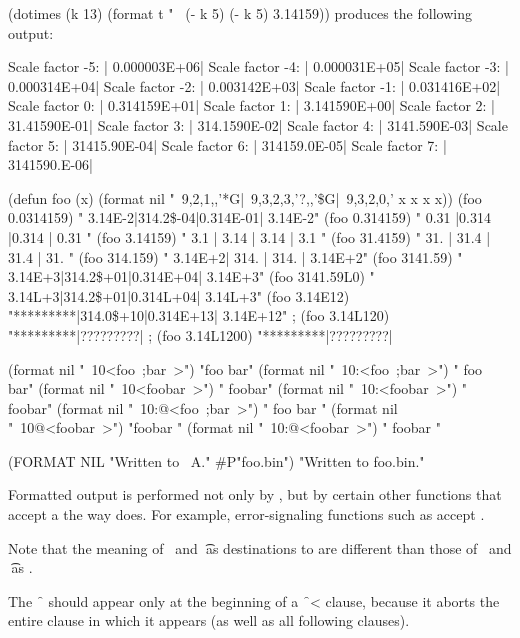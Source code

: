 \code
 (dotimes (k 13)
   (format t "~%
           (- k 5) (- k 5) 3.14159))
\endcode
produces the following output:

\code
Scale factor -5: | 0.000003E+06|
Scale factor -4: | 0.000031E+05|
Scale factor -3: | 0.000314E+04|
Scale factor -2: | 0.003142E+03|
Scale factor -1: | 0.031416E+02|
Scale factor  0: | 0.314159E+01|
Scale factor  1: | 3.141590E+00|
Scale factor  2: | 31.41590E-01|
Scale factor  3: | 314.1590E-02|
Scale factor  4: | 3141.590E-03|
Scale factor  5: | 31415.90E-04|
Scale factor  6: | 314159.0E-05|
Scale factor  7: | 3141590.E-06|
\endcode

\code
 (defun foo (x)
   (format nil "~9,2,1,,'*G|~9,3,2,3,'?,,'\$G|~9,3,2,0,'%
          x x x x))                                     
 (foo 0.0314159) \EV "  3.14E-2|314.2\$-04|0.314E-01|  3.14E-2"
 (foo 0.314159)  \EV "  0.31   |0.314    |0.314    | 0.31    "
 (foo 3.14159)   \EV "   3.1   | 3.14    | 3.14    |  3.1    "
 (foo 31.4159)   \EV "   31.   | 31.4    | 31.4    |  31.    "
 (foo 314.159)   \EV "  3.14E+2| 314.    | 314.    |  3.14E+2"
 (foo 3141.59)   \EV "  3.14E+3|314.2\$+01|0.314E+04|  3.14E+3"
 (foo 3141.59L0) \EV "  3.14L+3|314.2\$+01|0.314L+04|  3.14L+3"
 (foo 3.14E12)   \EV "*********|314.0\$+10|0.314E+13| 3.14E+12"
 ; (foo 3.14L120)  \EV "*********|?????????|%
 ; (foo 3.14L1200) \EV "*********|?????????|%
\endcode

\code
 (format nil "~10<foo~;bar~>")   \EV "foo    bar"
 (format nil "~10:<foo~;bar~>")  \EV "  foo  bar"
 (format nil "~10<foobar~>")     \EV "    foobar"
 (format nil "~10:<foobar~>")    \EV "    foobar"
 (format nil "~10:@<foo~;bar~>") \EV "  foo bar "
 (format nil "~10@<foobar~>")    \EV "foobar    "
 (format nil "~10:@<foobar~>")   \EV "  foobar  "
\endcode

\code
  (FORMAT NIL "Written to ~A." #P"foo.bin")
  \EV "Written to foo.bin."
\endcode
{}

\endsubsection%


Formatted output is performed not only by ,
but by certain other functions that accept a 
the way  does.  For example, error-signaling functions
such as  accept .

Note that the meaning of \nil\ and \t\ as destinations to  
are different than those of \nil\ and \t\ as .

The \f{~{\hat}} should appear only at the beginning of a \f{~<} clause,
because it aborts the entire clause in which it appears (as well as
all following clauses).                                     

\endsubsection%
